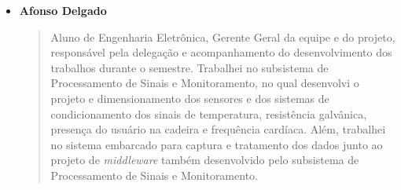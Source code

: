 \begin{itemize}
    \item \textbf{Afonso Delgado}
    \begin{quote}
      Aluno de Engenharia Eletrônica, Gerente Geral da equipe e do projeto, 
      responsável pela delegação e acompanhamento do desenvolvimento dos 
      trabalhos durante o semestre. Trabalhei no subsistema de Processamento 
      de Sinais e Monitoramento, no qual desenvolvi o projeto e dimensionamento 
      dos sensores e dos sistemas de condicionamento dos sinais de temperatura, 
      resistência galvânica, presença do usuário na cadeira e frequência 
      cardíaca. Além, trabalhei no sistema embarcado para captura e tratamento
      dos dados junto ao projeto de \textit{middleware} também desenvolvido pelo 
      subsistema de Processamento de Sinais e Monitoramento.
    \end{quote}
\end{itemize}
